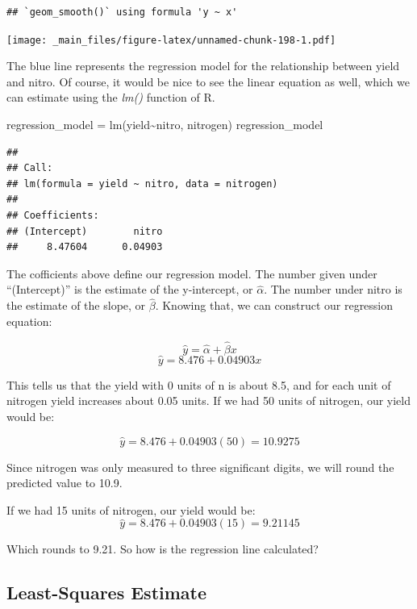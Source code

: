 \documentclass[
]{book}
\newenvironment{Shaded}{\begin{snugshade}}{\end{snugshade}}
\newcommand{\FunctionTok}[1]{\textcolor[rgb]{0.00,0.00,0.00}{#1}}
\newcommand{\NormalTok}[1]{#1}
\newcommand{\OtherTok}[1]{\textcolor[rgb]{0.56,0.35,0.01}{#1}}
\newcommand{\SpecialCharTok}[1]{\textcolor[rgb]{0.00,0.00,0.00}{#1}}
\begin{document}
\begin{verbatim}
## `geom_smooth()` using formula 'y ~ x'
\end{verbatim}

\texttt{[image: \_main\_files/figure-latex/unnamed-chunk-198-1.pdf]}

The blue line represents the regression model for the relationship between yield and nitro. Of course, it would be nice to see the linear equation as well, which we can estimate using the \emph{lm()} function of R.

\begin{Shaded}
\begin{Highlighting}[]
\NormalTok{regression\_model }\OtherTok{=} \FunctionTok{lm}\NormalTok{(yield}\SpecialCharTok{\textasciitilde{}}\NormalTok{nitro, nitrogen)}
\NormalTok{regression\_model}
\end{Highlighting}
\end{Shaded}

\begin{verbatim}
## 
## Call:
## lm(formula = yield ~ nitro, data = nitrogen)
## 
## Coefficients:
## (Intercept)        nitro  
##     8.47604      0.04903
\end{verbatim}

The cofficients above define our regression model. The number given under ``(Intercept)'' is the estimate of the y-intercept, or \(\hat{\alpha}\). The number under nitro is the estimate of the slope, or \(\hat{\beta}\). Knowing that, we can construct our regression equation:

\[\hat{y} = \hat{\alpha} + \hat{\beta} x\]
\[\hat{y} = 8.476 + 0.04903x\]

This tells us that the yield with 0 units of n is about 8.5, and for each unit of nitrogen yield increases about 0.05 units. If we had 50 units of nitrogen, our yield would be:

\[\hat{y} = 8.476 + 0.04903(50) = 10.9275 \]

Since nitrogen was only measured to three significant digits, we will round the predicted value to 10.9.

If we had 15 units of nitrogen, our yield would be:
\[\hat{y} = 8.476 + 0.04903(15) = 9.21145 \]

Which rounds to 9.21. So how is the regression line calculated?

\hypertarget{least-squares-estimate}{%
\subsection{Least-Squares Estimate}\label{least-squares-estimate}}
\end{document}

